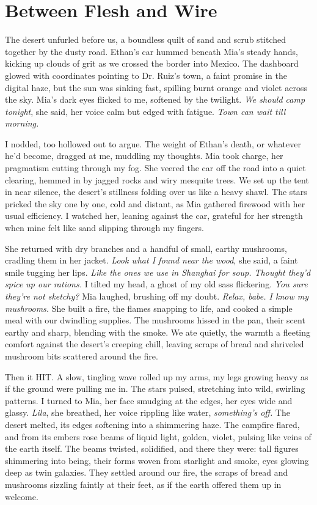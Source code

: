 \documentclass[12pt,oneside]{book} %
\begin{document}
\chapter{Between Flesh and Wire}

The desert unfurled before us, a boundless quilt of sand and scrub stitched together by the dusty road. Ethan's car hummed beneath Mia’s steady hands, kicking up clouds of grit as we crossed the border into Mexico. The dashboard glowed with coordinates pointing to Dr. Ruiz’s town, a faint promise in the digital haze, but the sun was sinking fast, spilling burnt orange and violet across the sky. Mia’s dark eyes flicked to me, softened by the twilight. \textit{We should camp tonight}, she said, her voice calm but edged with fatigue. \textit{Town can wait till morning.}

I nodded, too hollowed out to argue. The weight of Ethan’s death, or whatever he’d become, dragged at me, muddling my thoughts. Mia took charge, her pragmatism cutting through my fog. She veered the car off the road into a quiet clearing, hemmed in by jagged rocks and wiry mesquite trees. We set up the tent in near silence, the desert’s stillness folding over us like a heavy shawl. The stars pricked the sky one by one, cold and distant, as Mia gathered firewood with her usual efficiency. I watched her, leaning against the car, grateful for her strength when mine felt like sand slipping through my fingers.

She returned with dry branches and a handful of small, earthy mushrooms, cradling them in her jacket. \textit{Look what I found near the wood}, she said, a faint smile tugging her lips. \textit{Like the ones we use in Shanghai for soup. Thought they’d spice up our rations.} I tilted my head, a ghost of my old sass flickering. \textit{You sure they’re not sketchy?} Mia laughed, brushing off my doubt. \textit{Relax, babe. I know my mushrooms.} She built a fire, the flames snapping to life, and cooked a simple meal with our dwindling supplies. The mushrooms hissed in the pan, their scent earthy and sharp, blending with the smoke. We ate quietly, the warmth a fleeting comfort against the desert’s creeping chill, leaving scraps of bread and shriveled mushroom bits scattered around the fire.

Then it HIT. A slow, tingling wave rolled up my arms, my legs growing heavy as if the ground were pulling me in. The stars pulsed, stretching into wild, swirling patterns. I turned to Mia, her face smudging at the edges, her eyes wide and glassy. \textit{Lila}, she breathed, her voice rippling like water, \textit{something’s off.} The desert melted, its edges softening into a shimmering haze. The campfire flared, and from its embers rose beams of liquid light, golden, violet, pulsing like veins of the earth itself. The beams twisted, solidified, and there they were: tall figures shimmering into being, their forms woven from starlight and smoke, eyes glowing deep as twin galaxies. They settled around our fire, the scraps of bread and mushrooms sizzling faintly at their feet, as if the earth offered them up in welcome.
\end{document}
